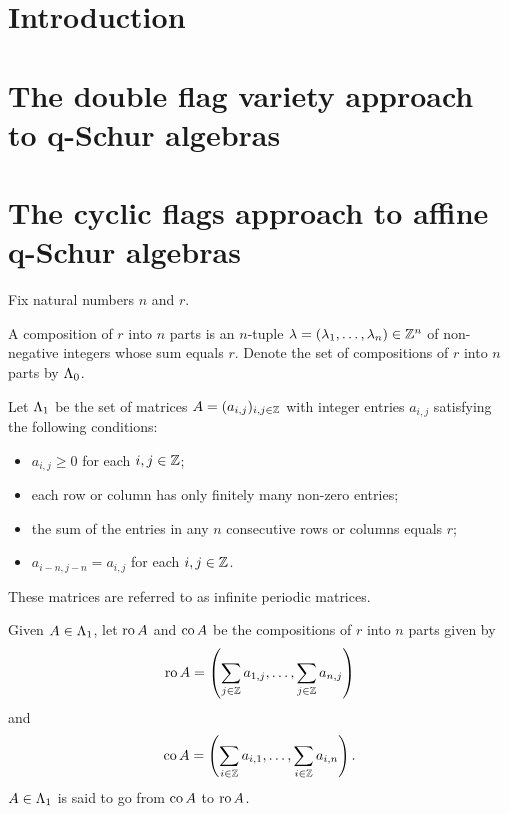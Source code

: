 \documentclass[a4paper, 11pt]{report}
\begin{document}
\maketitle

\tableofcontents

\chapter{Introduction}

\chapter{The double flag variety approach to q-Schur algebras}

\chapter{The cyclic flags approach to affine q-Schur algebras}

Fix natural numbers $n$ and $r$.

\begin{definition}[compositions]\label{def:compositions}
A composition of $r$ into $n$ parts is an $n$-tuple $\lambda=(\lambda_1,\ldots,\lambda_n)\in\mathbb{Z}^n$ of non-negative integers whose sum equals $r$. Denote the set of compositions of $r$ into $n$ parts by ${\Lambda_0}$.
\end{definition}

\begin{definition}\label{def:matrices}
Let ${\Lambda_1}$ be the set of matrices $A=(a_{i,j})_{i,j\in\mathbb{Z}}$ with integer entries $a_{i,j}$ satisfying the following conditions: 
\begin{itemize}
\item
$a_{i,j}\geq 0$ for each $i,j\in\mathbb{Z}$;
\item
each row or column has only finitely many non-zero entries;
\item
the sum of the entries in any $n$ consecutive rows or columns equals $r$;
\item
$a_{i-n,j-n}=a_{i,j}$ for each $i,j\in\mathbb{Z}$.
\end{itemize}
These matrices are referred to as infinite periodic matrices.
\end{definition}

\begin{definition}\label{def:source-target}
Given $A\in{\Lambda_1}$, let $\operatorname{ro}{A}$ and $\operatorname{co}{A}$ be the compositions of $r$ into $n$ parts given by
\begin{equation*}
\operatorname{ro}{A} = \left( \sum_{j\in\mathbb{Z}}a_{1,j}, \ldots, \sum_{j\in\mathbb{Z}} a_{n,j}\right)
\end{equation*}
and
\begin{equation*}
\operatorname{co}{A} = \left( \sum_{i\in\mathbb{Z}} a_{i,1}, \ldots, \sum_{i\in\mathbb{Z}} a_{i,n}\right).
\end{equation*}
$A\in{\Lambda_1}$ is said to go from $\operatorname{co}{A}$ to $\operatorname{ro}{A}$.
\end{definition}
\end{document}

